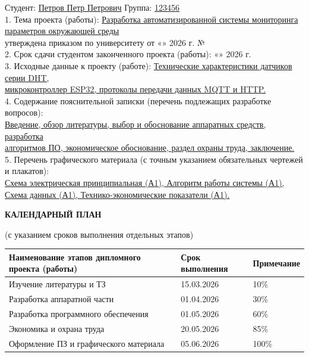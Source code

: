 \noindent Студент: \underline{Петров Петр Петрович} \hfill Группа: \underline{123456} \\
1. Тема проекта (работы): \underline{Разработка автоматизированной системы мониторинга} \\
\underline{параметров окружающей среды} \\
утверждена приказом по университету от «\underline{\hspace{0.5cm}}» \underline{\hspace{2cm}} 2026 г. № \underline{\hspace{1cm}} \\
2. Срок сдачи студентом законченного проекта (работы): «\underline{\hspace{0.5cm}}» \underline{\hspace{2cm}} 2026 г. \\
3. Исходные данные к проекту (работе): \underline{Технические характеристики датчиков серии DHT,} \\
\underline{микроконтроллер ESP32, протоколы передачи данных MQTT и HTTP.} \\
4. Содержание пояснительной записки (перечень подлежащих разработке вопросов): \\
\underline{Введение, обзор литературы, выбор и обоснование аппаратных средств, разработка} \\
\underline{алгоритмов ПО, экономическое обоснование, раздел охраны труда, заключение.} \\
5. Перечень графического материала (с точным указанием обязательных чертежей и плакатов): \\
\underline{Схема электрическая принципиальная (А1), Алгоритм работы системы (А1),} \\
\underline{Схема данных (А1), Технико-экономические показатели (А1).}

\vspace{0.5cm}

\begin{center}
    {\bfseries КАЛЕНДАРНЫЙ ПЛАН}
\end{center}
\noindent (с указанием сроков выполнения отдельных этапов)
\begin{center}
\begin{tabular}{|p{10cm}|p{3cm}|p{2cm}|}
\hline
Наименование этапов дипломного проекта (работы) & Срок выполнения & Примечание \\ \hline
Изучение литературы и ТЗ & 15.03.2026 & 10\% \\ \hline
Разработка аппаратной части & 01.04.2026 & 30\% \\ \hline
Разработка программного обеспечения & 01.05.2026 & 60\% \\ \hline
Экономика и охрана труда & 20.05.2026 & 85\% \\ \hline
Оформление ПЗ и графического материала & 05.06.2026 & 100\% \\ \hline
\end{tabular}
\end{center}

